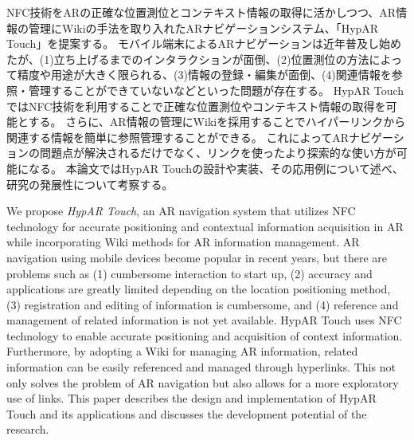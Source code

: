 


\begin{jabstract}
NFC技術をARの正確な位置測位とコンテキスト情報の取得に活かしつつ、AR情報の管理にWikiの手法を取り入れたARナビゲーションシステム、「HypAR Touch」を提案する。
モバイル端末によるARナビゲーションは近年普及し始めたが、(1)立ち上げるまでのインタラクションが面倒、(2)位置測位の方法によって精度や用途が大きく限られる、(3)情報の登録・編集が面倒、(4)関連情報を参照・管理することができていないなどといった問題が存在する。
HypAR TouchではNFC技術を利用することで正確な位置測位やコンテキスト情報の取得を可能とする。
さらに、AR情報の管理にWikiを採用することでハイパーリンクから関連する情報を簡単に参照管理することができる。
これによってARナビゲーションの問題点が解決されるだけでなく、リンクを使ったより探索的な使い方が可能になる。
本論文ではHypAR Touchの設計や実装、その応用例について述べ、研究の発展性について考察する。
\end{jabstract}



\begin{eabstract}
We propose \textit{HypAR Touch}, an AR navigation system that utilizes NFC technology for accurate positioning and contextual information acquisition in AR while incorporating Wiki methods for AR information management. 
AR navigation using mobile devices become popular in recent years, but there are problems such as (1) cumbersome interaction to start up, (2) accuracy and applications are greatly limited depending on the location positioning method, (3) registration and editing of information is cumbersome, and (4) reference and management of related information is not yet available. 
HypAR Touch uses NFC technology to enable accurate positioning and acquisition of context information. 
Furthermore, by adopting a Wiki for managing AR information, related information can be easily referenced and managed through hyperlinks. 
This not only solves the problem of AR navigation but also allows for a more exploratory use of links.
This paper describes the design and implementation of HypAR Touch and its applications and discusses the development potential of the research.
\end{eabstract}
